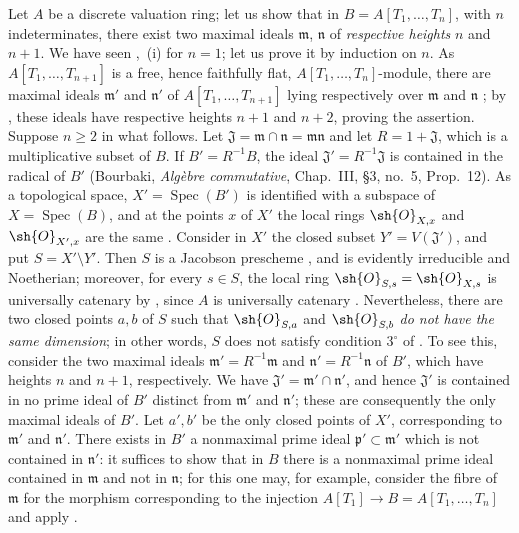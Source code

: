 \begin{env}[10.7.3]
\label{IV.10.7.3}
Let $A$ be a discrete valuation ring; let us show that in $B=A[T_1,\ldots,T_n]$, with $n$ indeterminates, there exist two maximal ideals $\mathfrak{m}$, $\mathfrak{n}$ of \emph{respective heights} $n$ and $n+1$.
We have seen ,~(i) for $n=1$; let us prove it by induction on $n$.
As $A[T_1,\ldots,T_{n+1}]$ is a free, hence faithfully flat, $A[T_1,\ldots,T_n]$-module, there are maximal ideals $\mathfrak{m}'$ and $\mathfrak{n}'$ of $A[T_1,\ldots,T_{n+1}]$ lying respectively over $\mathfrak{m}$ and $\mathfrak{n}$ ; by , these ideals have respective heights $n+1$ and $n+2$, proving the assertion.
Suppose $n\geq 2$ in what follows.
Let $\mathfrak{J}=\mathfrak{m}\cap\mathfrak{n}=\mathfrak{m}\mathfrak{n}$ and let $R=1+\mathfrak{J}$, which is a multiplicative subset of $B$.
If $B'=R^{-1}B$, the ideal $\mathfrak{J}'=R^{-1}\mathfrak{J}$ is contained in the radical of $B'$ (Bourbaki, \emph{Alg\`ebre commutative}, Chap.~III, \S3, no.~5, Prop.~12).
As a topological space, $X'=\operatorname{Spec}(B')$ is identified with a subspace of $X=\operatorname{Spec}(B)$, and at the points $x$ of $X'$ the local rings $\sh{O}_{X,x}$ and $\sh{O}_{X',x}$ are the same .
Consider in $X'$ the closed subset $Y'=V(\mathfrak{J}')$, and put $S=X'\setminus Y'$.
Then $S$ is a Jacobson prescheme , and is evidently irreducible and Noetherian; moreover, for every $s\in S$, the local ring $\sh{O}_{S,s}=\sh{O}_{X,s}$ is universally catenary by , since $A$ is universally catenary .
Nevertheless, there are two closed points $a,b$ of $S$ such that $\sh{O}_{S,a}$ and $\sh{O}_{S,b}$ \emph{do not have the same dimension}; in other words, $S$ does not satisfy condition $3^\circ$ of .
To see this, consider the two maximal ideals $\mathfrak{m}'=R^{-1}\mathfrak{m}$ and $\mathfrak{n}'=R^{-1}\mathfrak{n}$ of $B'$, which have heights $n$ and $n+1$, respectively.
We have $\mathfrak{J}'=\mathfrak{m}'\cap\mathfrak{n}'$, and hence $\mathfrak{J}'$ is contained in no prime ideal of $B'$ distinct from $\mathfrak{m}'$ and $\mathfrak{n}'$; these are consequently the only maximal ideals of $B'$.
Let $a',b'$ be the only closed points of $X'$, corresponding to $\mathfrak{m}'$ and $\mathfrak{n}'$.
There exists in $B'$ a nonmaximal prime ideal $\mathfrak{p}'\subset\mathfrak{m}'$ which is not contained in $\mathfrak{n}'$: it suffices to show that in $B$ there is a nonmaximal prime ideal contained in $\mathfrak{m}$ and not in $\mathfrak{n}$; for this one may, for example, consider the fibre of $\mathfrak{m}$ for the morphism corresponding to the injection $A[T_1]\longrightarrow B=A[T_1,\ldots,T_n]$ and apply .

\end{env}
